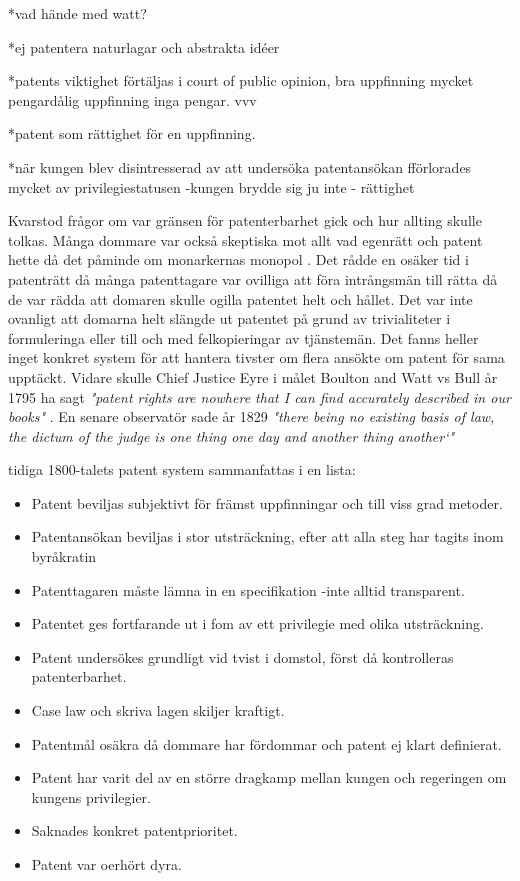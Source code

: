 *vad hände med watt?

*ej patentera naturlagar och abstrakta idéer 

*patents viktighet förtäljas i court of public opinion, bra uppfinning mycket pengardålig uppfinning inga pengar. vvv

*patent som rättighet för en uppfinning.

*när kungen blev disintresserad av att undersöka patentansökan fförlorades mycket av privilegiestatusen -kungen brydde sig ju inte - rättighet


Kvarstod frågor om var gränsen för patenterbarhet gick och hur allting skulle tolkas\cite{bracha}. Många dommare var också skeptiska mot allt vad egenrätt och patent hette då det påminde om monarkernas monopol \cite{macleod}.
Det rådde en osäker tid i patenträtt då många patenttagare var ovilliga att föra intrångsmän till
rätta då de var rädda att domaren skulle ogilla patentet helt och hållet. Det var inte ovanligt att
domarna helt slängde ut patentet på grund av trivialiteter i formuleringa eller till och med
felkopieringar av tjänstemän\cite{macleod}. Det fanns heller inget konkret system för att hantera tivster om flera ansökte om patent för sama upptäckt\cite{bracha, webster}. Vidare skulle Chief Justice Eyre i målet Boulton and Watt vs Bull år 1795 ha sagt \emph{"patent rights are nowhere that I can find accurately described in our books"} \cite{macleod}. En senare observatör sade år 1829 \emph{"there being no existing basis of law, the dictum of the judge is 
one thing one day and another thing another‘"} \cite{macleod}

tidiga 1800-talets patent system sammanfattas i en lista:

\begin{itemize}
	\item Patent beviljas subjektivt för främst uppfinningar och till viss grad metoder.
	\item Patentansökan beviljas i stor utsträckning, efter att alla steg har tagits inom byråkratin
	\item Patenttagaren måste lämna in en specifikation -inte alltid transparent.
	\item Patentet ges fortfarande ut i fom av ett privilegie med olika utsträckning.
	\item Patent undersökes grundligt vid tvist i domstol, först då kontrolleras patenterbarhet.
	\item Case law och skriva lagen skiljer kraftigt.
	\item Patentmål osäkra då dommare har fördommar och patent ej klart definierat.
	\item Patent har varit del av en större dragkamp mellan kungen och regeringen om kungens privilegier. 
	\item Saknades konkret patentprioritet.
	\item Patent var oerhört dyra.
\end{itemize}

